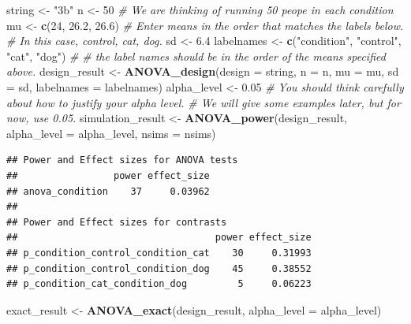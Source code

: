 \documentclass[]{book}
\newenvironment{Shaded}{\begin{snugshade}}{\end{snugshade}}
\newcommand{\CommentTok}[1]{\textcolor[rgb]{0.56,0.35,0.01}{\textit{#1}}}
\newcommand{\DataTypeTok}[1]{\textcolor[rgb]{0.13,0.29,0.53}{#1}}
\newcommand{\DecValTok}[1]{\textcolor[rgb]{0.00,0.00,0.81}{#1}}
\newcommand{\FloatTok}[1]{\textcolor[rgb]{0.00,0.00,0.81}{#1}}
\newcommand{\KeywordTok}[1]{\textcolor[rgb]{0.13,0.29,0.53}{\textbf{#1}}}
\newcommand{\NormalTok}[1]{#1}
\newcommand{\StringTok}[1]{\textcolor[rgb]{0.31,0.60,0.02}{#1}}
\begin{document}
\begin{Shaded}
\begin{Highlighting}[]
\NormalTok{string <-}\StringTok{ "3b"}
\NormalTok{n <-}\StringTok{ }\DecValTok{50}
\CommentTok{# We are thinking of running 50 peope in each condition}
\NormalTok{mu <-}\StringTok{ }\KeywordTok{c}\NormalTok{(}\DecValTok{24}\NormalTok{, }\FloatTok{26.2}\NormalTok{, }\FloatTok{26.6}\NormalTok{)}
\CommentTok{# Enter means in the order that matches the labels below.}
\CommentTok{# In this case, control, cat, dog. }
\NormalTok{sd <-}\StringTok{ }\FloatTok{6.4}
\NormalTok{labelnames <-}\StringTok{ }\KeywordTok{c}\NormalTok{(}\StringTok{"condition"}\NormalTok{, }\StringTok{"control"}\NormalTok{, }\StringTok{"cat"}\NormalTok{, }\StringTok{"dog"}\NormalTok{) }\CommentTok{#}
\CommentTok{# the label names should be in the order of the means specified above.}
\NormalTok{design_result <-}\StringTok{ }\KeywordTok{ANOVA_design}\NormalTok{(}\DataTypeTok{design =}\NormalTok{ string,}
                   \DataTypeTok{n =}\NormalTok{ n, }
                   \DataTypeTok{mu =}\NormalTok{ mu, }
                   \DataTypeTok{sd =}\NormalTok{ sd, }
                   \DataTypeTok{labelnames =}\NormalTok{ labelnames)}
\NormalTok{alpha_level <-}\StringTok{ }\FloatTok{0.05}
\CommentTok{# You should think carefully about how to justify your alpha level.}
\CommentTok{# We will give some examples later, but for now, use 0.05.}
\NormalTok{simulation_result <-}\StringTok{ }\KeywordTok{ANOVA_power}\NormalTok{(design_result, }\DataTypeTok{alpha_level =}\NormalTok{ alpha_level, }\DataTypeTok{nsims =}\NormalTok{ nsims)}
\end{Highlighting}
\end{Shaded}

\begin{verbatim}
## Power and Effect sizes for ANOVA tests
##                 power effect_size
## anova_condition    37     0.03962
## 
## Power and Effect sizes for contrasts
##                                   power effect_size
## p_condition_control_condition_cat    30     0.31993
## p_condition_control_condition_dog    45     0.38552
## p_condition_cat_condition_dog         5     0.06223
\end{verbatim}

\begin{Shaded}
\begin{Highlighting}[]
\NormalTok{exact_result <-}\StringTok{ }\KeywordTok{ANOVA_exact}\NormalTok{(design_result, }\DataTypeTok{alpha_level =}\NormalTok{ alpha_level)}
\end{Highlighting}
\end{Shaded}
\end{document}
